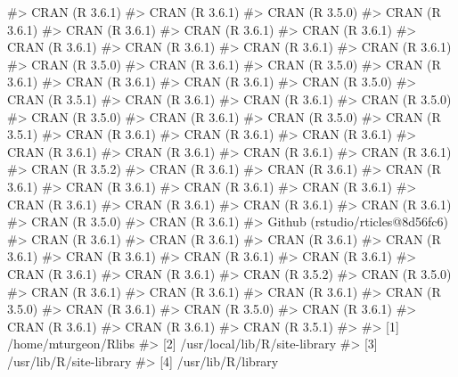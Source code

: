 \documentclass[
]{jss}
\begin{document}
\begin{CodeChunk}
\begin{CodeOutput}
#>  CRAN (R 3.6.1)                          
#>  CRAN (R 3.6.1)                          
#>  CRAN (R 3.5.0)                          
#>  CRAN (R 3.6.1)                          
#>  CRAN (R 3.6.1)                          
#>  CRAN (R 3.6.1)                          
#>  CRAN (R 3.6.1)                          
#>  CRAN (R 3.6.1)                          
#>  CRAN (R 3.6.1)                          
#>  CRAN (R 3.6.1)                          
#>  CRAN (R 3.6.1)                          
#>  CRAN (R 3.5.0)                          
#>  CRAN (R 3.6.1)                          
#>  CRAN (R 3.5.0)                          
#>  CRAN (R 3.6.1)                          
#>  CRAN (R 3.6.1)                          
#>  CRAN (R 3.6.1)                          
#>  CRAN (R 3.5.0)                          
#>  CRAN (R 3.5.1)                          
#>  CRAN (R 3.6.1)                          
#>  CRAN (R 3.6.1)                          
#>  CRAN (R 3.5.0)                          
#>  CRAN (R 3.5.0)                          
#>  CRAN (R 3.6.1)                          
#>  CRAN (R 3.5.0)                          
#>  CRAN (R 3.5.1)                          
#>  CRAN (R 3.6.1)                          
#>  CRAN (R 3.6.1)                          
#>  CRAN (R 3.6.1)                          
#>  CRAN (R 3.6.1)                          
#>  CRAN (R 3.6.1)                          
#>  CRAN (R 3.6.1)                          
#>  CRAN (R 3.6.1)                          
#>  CRAN (R 3.5.2)                          
#>  CRAN (R 3.6.1)                          
#>  CRAN (R 3.6.1)                          
#>  CRAN (R 3.6.1)                          
#>  CRAN (R 3.6.1)                          
#>  CRAN (R 3.6.1)                          
#>  CRAN (R 3.6.1)                          
#>  CRAN (R 3.6.1)                          
#>  CRAN (R 3.6.1)                          
#>  CRAN (R 3.6.1)                          
#>  CRAN (R 3.6.1)                          
#>  CRAN (R 3.5.0)                          
#>  CRAN (R 3.6.1)                          
#>  Github (rstudio/rticles@8d56fc6)        
#>  CRAN (R 3.6.1)                          
#>  CRAN (R 3.6.1)                          
#>  CRAN (R 3.6.1)                          
#>  CRAN (R 3.6.1)                          
#>  CRAN (R 3.6.1)                          
#>  CRAN (R 3.6.1)                          
#>  CRAN (R 3.6.1)                          
#>  CRAN (R 3.6.1)                          
#>  CRAN (R 3.6.1)                          
#>  CRAN (R 3.5.2)                          
#>  CRAN (R 3.5.0)                          
#>  CRAN (R 3.6.1)                          
#>  CRAN (R 3.6.1)                          
#>  CRAN (R 3.6.1)                          
#>  CRAN (R 3.5.0)                          
#>  CRAN (R 3.6.1)                          
#>  CRAN (R 3.5.0)                          
#>  CRAN (R 3.6.1)                          
#>  CRAN (R 3.6.1)                          
#>  CRAN (R 3.6.1)                          
#>  CRAN (R 3.5.1)                          
#> 
#> [1] /home/mturgeon/Rlibs
#> [2] /usr/local/lib/R/site-library
#> [3] /usr/lib/R/site-library
#> [4] /usr/lib/R/library
\end{CodeOutput}
\end{CodeChunk}
\end{document}
